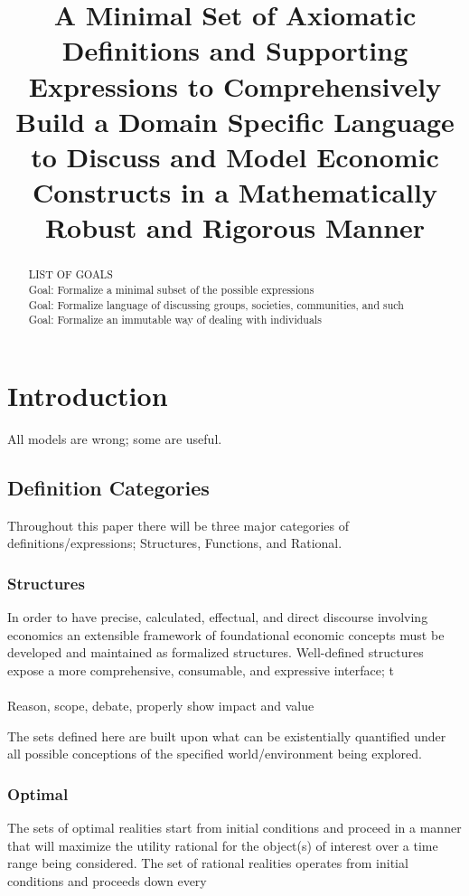 \documentclass[]{article}
\title{A Minimal Set of Axiomatic Definitions and Supporting Expressions to Comprehensively Build a Domain Specific Language to Discuss and Model Economic Constructs in a Mathematically Robust and Rigorous Manner}
\begin{document}
\maketitle

\begin{abstract}
LIST OF GOALS
\\Goal: Formalize a minimal subset of the possible expressions
\\Goal: Formalize language of discussing groups, societies, communities, and such
\\Goal: Formalize an immutable way of dealing with individuals
\end{abstract}
\section*{Introduction}
All models are wrong; some are useful. 
\subsection*{Definition Categories}
Throughout this paper there will be three major categories of definitions/expressions; Structures, Functions, and Rational.
%
\subsubsection*{Structures}
In order to have precise, calculated, effectual, and direct discourse involving economics an extensible framework of foundational economic concepts must be developed and maintained as formalized structures. Well-defined structures expose a more comprehensive, consumable, and expressive interface; t
\\
\\
 
Reason, scope, debate, properly show impact and value 

The sets defined here are built upon what can be existentially quantified under all possible conceptions of the specified world/environment being explored. 


%
\subsubsection*{Optimal}
 The sets of optimal realities start from initial conditions and proceed in a manner that will maximize the utility rational for the object(s) of interest over a time range being considered. The set of rational realities operates from initial conditions and proceeds down every
%
\end{document}
